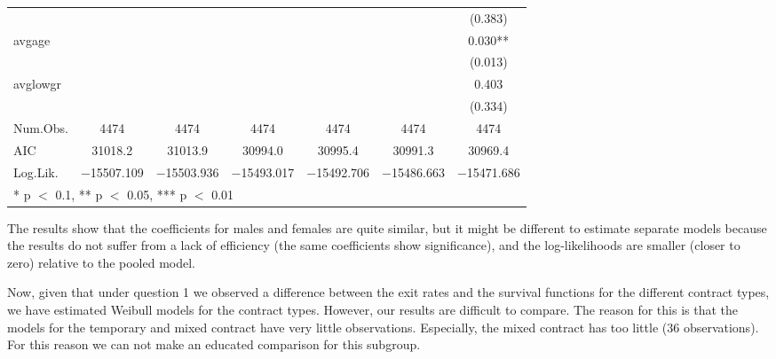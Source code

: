 \documentclass[
]{article}
\begin{document}
\begin{table}[!h]
{\begin{tabular}[t]{lcccccc}
 &  &  &  &  &  & (\num{0.383})\\
avgage &  &  &  &  &  & \num{0.030}**\\
 &  &  &  &  &  & (\num{0.013})\\
avglowgr &  &  &  &  &  & \num{0.403}\\
 &  &  &  &  &  & (\num{0.334})\\
\midrule
Num.Obs. & \num{4474} & \num{4474} & \num{4474} & \num{4474} & \num{4474} & \num{4474}\\
AIC & \num{31018.2} & \num{31013.9} & \num{30994.0} & \num{30995.4} & \num{30991.3} & \num{30969.4}\\
Log.Lik. & \num{-15507.109} & \num{-15503.936} & \num{-15493.017} & \num{-15492.706} & \num{-15486.663} & \num{-15471.686}\\
\bottomrule
\multicolumn{7}{l}{\rule{0pt}{1em}* p $<$ 0.1, ** p $<$ 0.05, *** p $<$ 0.01}\\
\end{tabular}}
\end{table}

The results show that the coefficients for males and females are quite
similar, but it might be different to estimate separate models because
the results do not suffer from a lack of efficiency (the same
coefficients show significance), and the log-likelihoods are smaller
(closer to zero) relative to the pooled model.

\clearpage

Now, given that under question 1 we observed a difference between the
exit rates and the survival functions for the different contract types,
we have estimated Weibull models for the contract types. However, our
results are difficult to compare. The reason for this is that the models
for the temporary and mixed contract have very little observations.
Especially, the mixed contract has too little (36 observations). For
this reason we can not make an educated comparison for this subgroup.
\end{document}
